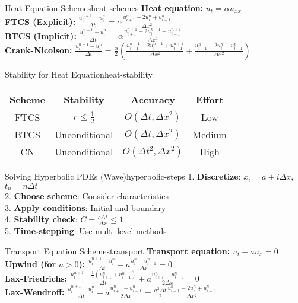 \documentclass[10pt,a4paper,landscape]{article}
\begin{document}
\begin{multicols}{3}
\begin{formulabox}{Heat Equation Schemes}{heat-schemes}
\textbf{Heat equation:} $u_t = \alpha u_{xx}$ \\[0.5em]
\textbf{FTCS (Explicit):} 
$\frac{u_i^{n+1} - u_i^n}{\Delta t} = \alpha \frac{u_{i+1}^n - 2u_i^n + u_{i-1}^n}{\Delta x^2}$ \\[0.5em]
\textbf{BTCS (Implicit):} 
$\frac{u_i^{n+1} - u_i^n}{\Delta t} = \alpha \frac{u_{i+1}^{n+1} - 2u_i^{n+1} + u_{i-1}^{n+1}}{\Delta x^2}$ \\[0.5em]
\textbf{Crank-Nicolson:} 
$\frac{u_i^{n+1} - u_i^n}{\Delta t} = \frac{\alpha}{2} \left(\frac{u_{i+1}^{n+1} - 2u_i^{n+1} + u_{i-1}^{n+1}}{\Delta x^2} + \frac{u_{i+1}^n - 2u_i^n + u_{i-1}^n}{\Delta x^2}\right)$
\end{formulabox}

\begin{formulabox}{Stability for Heat Equation}{heat-stability}
\begin{tabular}{|c|c|c|c|}
\hline
\textbf{Scheme} & \textbf{Stability} & \textbf{Accuracy} & \textbf{Effort} \\
\hline
FTCS & $r \leq \frac{1}{2}$ & $O(\Delta t, \Delta x^2)$ & Low \\
BTCS & Unconditional & $O(\Delta t, \Delta x^2)$ & Medium \\
CN & Unconditional & $O(\Delta t^2, \Delta x^2)$ & High \\
\hline
\end{tabular}
\end{formulabox}

\begin{codebox}{Solving Hyperbolic PDEs (Wave)}{hyperbolic-steps}
1. \textbf{Discretize}: $x_i = a + i\Delta x$, $t_n = n\Delta t$ \\
2. \textbf{Choose scheme}: Consider characteristics \\
3. \textbf{Apply conditions}: Initial and boundary \\
4. \textbf{Stability check}: $C = \frac{c\Delta t}{\Delta x} \leq 1$ \\
5. \textbf{Time-stepping}: Use multi-level methods
\end{codebox}

\begin{formulabox}{Transport Equation Schemes}{transport}
\textbf{Transport equation:} $u_t + au_x = 0$ \\[0.5em]
\textbf{Upwind (for $a > 0$):} 
$\frac{u_i^{n+1} - u_i^n}{\Delta t} + a\frac{u_i^n - u_{i-1}^n}{\Delta x} = 0$ \\[0.5em]
\textbf{Lax-Friedrichs:} 
$\frac{u_i^{n+1} - \frac{1}{2}(u_{i+1}^n + u_{i-1}^n)}{\Delta t} + a\frac{u_{i+1}^n - u_{i-1}^n}{2\Delta x} = 0$ \\[0.5em]
\textbf{Lax-Wendroff:} 
$\frac{u_i^{n+1} - u_i^n}{\Delta t} + a\frac{u_{i+1}^n - u_{i-1}^n}{2\Delta x} = \frac{a^2\Delta t}{2}\frac{u_{i+1}^n - 2u_i^n + u_{i-1}^n}{\Delta x^2}$
\end{formulabox}


\end{multicols}
\end{document}
